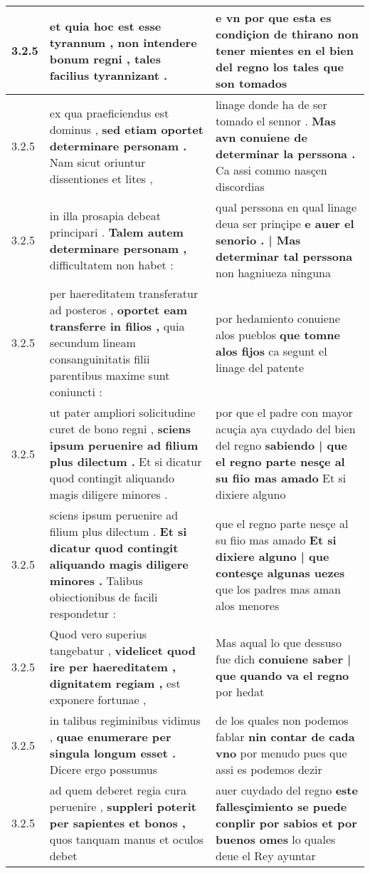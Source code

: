 \begin{tabular}{|p{1cm}|p{6.5cm}|p{6.5cm}|}
3.2.5 & et quia hoc est esse tyrannum , \textbf{ non intendere bonum regni , } tales facilius tyrannizant . & e vn por que esta es condiçion de thirano \textbf{ non tener mientes en el bien del regno } los tales que son tomados \\\hline
3.2.5 & ex qua praeficiendus est dominus , \textbf{ sed etiam oportet determinare personam . } Nam sicut oriuntur dissentiones et lites , & linage donde ha de ser tomado el sennor . \textbf{ Mas avn conuiene de determinar la perssona . } Ca assi commo nasçen discordias \\\hline
3.2.5 & in illa prosapia debeat principari . \textbf{ Talem autem determinare personam , } difficultatem non habet : & qual perssona en qual linage deua ser prinçipe \textbf{ e auer el senorio . | Mas determinar tal perssona } non hagniueza ninguna \\\hline
3.2.5 & per haereditatem transferatur ad posteros , \textbf{ oportet eam transferre in filios , } quia secundum lineam consanguinitatis filii parentibus maxime sunt coniuncti : & por hedamiento conuiene alos pueblos \textbf{ que tomne alos fijos } ca segunt el linage del patente \\\hline
3.2.5 & ut pater ampliori solicitudine curet de bono regni , \textbf{ sciens ipsum peruenire ad filium plus dilectum . } Et si dicatur quod contingit aliquando magis diligere minores . & por que el padre con mayor acuçia aya cuydado del bien del regno \textbf{ sabiendo | que el regno parte nesçe al su fiio mas amado } Et si dixiere alguno \\\hline
3.2.5 & sciens ipsum peruenire ad filium plus dilectum . \textbf{ Et si dicatur quod contingit aliquando magis diligere minores . } Talibus obiectionibus de facili respondetur : & que el regno parte nesçe al su fiio mas amado \textbf{ Et si dixiere alguno | que contesçe algunas uezes } que los padres mas aman alos menores \\\hline
3.2.5 & Quod vero superius tangebatur , \textbf{ videlicet quod ire per haereditatem , dignitatem regiam , } est exponere fortunae , & Mas aqual lo que dessuso fue dich \textbf{ conuiene saber | que quando va el regno } por hedat \\\hline
3.2.5 & in talibus regiminibus vidimus , \textbf{ quae enumerare per singula longum esset . } Dicere ergo possumus & de los quales non podemos fablar \textbf{ nin contar de cada vno } por menudo pues que assi es podemos dezir \\\hline
3.2.5 & ad quem deberet regia cura peruenire , \textbf{ suppleri poterit per sapientes et bonos , } quos tanquam manus et oculos debet & auer cuydado del regno \textbf{ este fallesçimiento se puede conplir por sabios et por buenos omes } lo quales deue el Rey ayuntar \\\hline

\end{tabular}
